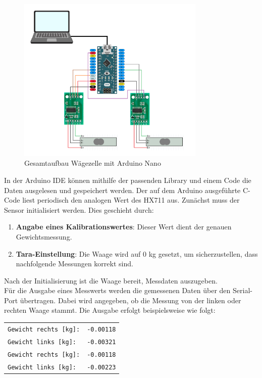 \begin{figure}[h!]
    \centering
    \includegraphics[width=0.8\textwidth]{img/Schaltungs-Aufbau.png}
    \caption{Gesamtaufbau Wägezelle mit Arduino Nano}
    \label{Gesamtaufbau-waegezelle-mit-Arduino-Nano}
\end{figure}
In der Arduino IDE können mithilfe der passenden Library und einem Code die Daten ausgelesen und gespeichert werden. 
Der auf dem Arduino ausgeführte C-Code liest periodisch den analogen Wert des HX711 aus. Zunächst muss der Sensor initialisiert werden. Dies geschieht durch:
\begin{enumerate}
    \item \textbf{Angabe eines Kalibrationswertes}: Dieser Wert dient der genauen Gewichtsmessung.
    \item \textbf{Tara-Einstellung}: Die Waage wird auf 0 kg gesetzt, um sicherzustellen, dass nachfolgende Messungen korrekt sind.
\end{enumerate}
Nach der Initialisierung ist die Waage bereit, Messdaten auszugeben.
\\
Für die Ausgabe eines Messwerts werden die gemessenen Daten über den Serial-Port übertragen.
Dabei wird angegeben, ob die Messung von der linken oder rechten Waage stammt.
Die Ausgabe erfolgt beispielsweise wie folgt:
\begin{center}
    \begin{tabular}{l r}
        \texttt{Gewicht rechts [kg]:} & \texttt{-0.00118} \\
        \texttt{Gewicht links [kg]:}  & \texttt{-0.00321} \\
        \texttt{Gewicht rechts [kg]:} & \texttt{-0.00118} \\
        \texttt{Gewicht links [kg]:}  & \texttt{-0.00223} \\
    \end{tabular}
\end{center}

